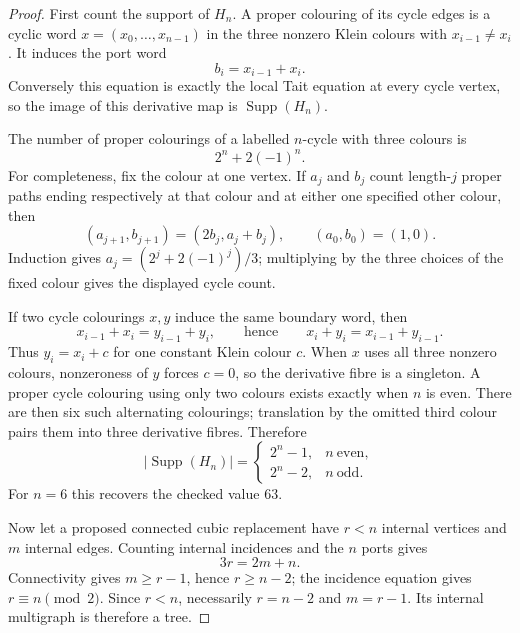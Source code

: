 \begin{proof}
First count the support of \(H_n\).  A proper colouring of its cycle edges
is a cyclic word \(x=(x_0,\ldots,x_{n-1})\) in the three nonzero Klein
colours with \(x_{i-1}\ne x_i\).  It induces the port word
\[
                             b_i=x_{i-1}+x_i.
\]
Conversely this equation is exactly the local Tait equation at every cycle
vertex, so the image of this derivative map is
\(\operatorname{Supp}(H_n)\).

The number of proper colourings of a labelled \(n\)-cycle with three colours
is
\[
                         2^n+2(-1)^n.
\]
For completeness, fix the colour at one vertex.  If \(a_j\) and \(b_j\)
count length-\(j\) proper paths ending respectively at that colour and at
either one specified other colour, then
\[
 (a_{j+1},b_{j+1})=(2b_j,a_j+b_j),\qquad (a_0,b_0)=(1,0).
\]
Induction gives \(a_j=(2^j+2(-1)^j)/3\); multiplying by the three choices
of the fixed colour gives the displayed cycle count.

If two cycle colourings \(x,y\) induce the same boundary word, then
\[
 x_{i-1}+x_i=y_{i-1}+y_i,
 \qquad\text{hence}\qquad
 x_i+y_i=x_{i-1}+y_{i-1}.
\]
Thus \(y_i=x_i+c\) for one constant Klein colour \(c\).  When \(x\) uses
all three nonzero colours, nonzeroness of \(y\) forces \(c=0\), so the
derivative fibre is a singleton.  A proper cycle colouring using only two
colours exists exactly when \(n\) is even.  There are then six such
alternating colourings; translation by the omitted third colour pairs them
into three derivative fibres.  Therefore
\[
|\operatorname{Supp}(H_n)|=
 \begin{cases}
   2^n-1,&n\ \text{even},\\
   2^n-2,&n\ \text{odd}.
 \end{cases}
\]
For \(n=6\) this recovers the checked value \(63\).

Now let a proposed connected cubic replacement have \(r<n\) internal
vertices and \(m\) internal edges.  Counting internal incidences and the
\(n\) ports gives
\[
                             3r=2m+n.
\]
Connectivity gives \(m\geq r-1\), hence \(r\geq n-2\); the incidence
equation gives \(r\equiv n\pmod2\).  Since \(r<n\), necessarily
\(r=n-2\) and \(m=r-1\).  Its internal multigraph is therefore a tree.


\end{proof}
